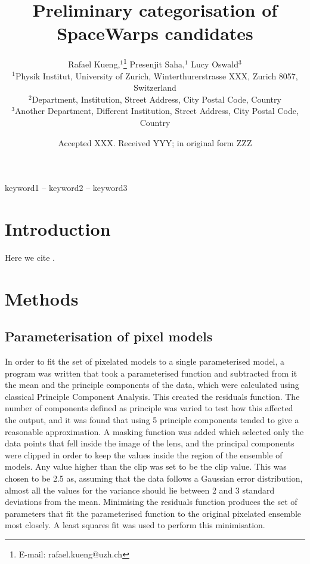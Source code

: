\documentclass[a4paper,fleqn,usenatbib]{mnras}
\title[Short title, max. 45 characters]{Preliminary categorisation of SpaceWarps candidates}
\author[R. Kueng et al.]{
Rafael Kueng,$^{1}$\thanks{E-mail: rafael.kueng@uzh.ch}
Presenjit Saha,$^{1}$
Lucy Oswald$^{3}$
\\
$^{1}$Physik Institut, University of Zurich, Winterthurerstrasse XXX, Zurich 8057, Switzerland\\
$^{2}$Department, Institution, Street Address, City Postal Code, Country\\
$^{3}$Another Department, Different Institution, Street Address, City Postal Code, Country
}
\date{Accepted XXX. Received YYY; in original form ZZZ}
\begin{document}
\label{firstpage}
\pagerange{\pageref{firstpage}--\pageref{lastpage}}
\maketitle

\begin{abstract}

\end{abstract}

\begin{keywords}
keyword1 -- keyword2 -- keyword3
\end{keywords}


\section{Introduction}

Here we cite \cite{2015MNRAS.447.2170K}.

\section{Methods}

\subsection{Parameterisation of pixel models}
In order to fit the set of pixelated models to a single parameterised model, a program was written that took a parameterised function and subtracted from it the mean and the principle components of the data, which were calculated using classical Principle Component Analysis.
This created the residuals function.
The number of components defined as principle was varied to test how this affected the output, and it was found that using 5 principle components tended to give a reasonable approximation.
A masking function was added which selected only the data points that fell inside the image of the lens, and the principal components were clipped in order to keep the values inside the region of the ensemble of models.
Any value higher than the clip was set to be the clip value.
This was chosen to be 2.5 as, assuming that the data follows a Gaussian error distribution, almost all the values for the variance should lie between 2 and 3 standard deviations from the mean.
Minimising the residuals function produces the set of parameters that fit the parameterised function to the original pixelated ensemble most closely.
A least squares fit was used to perform this minimisation.
\end{document}
